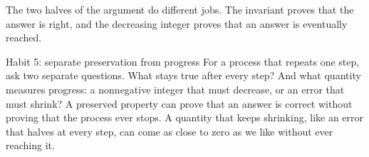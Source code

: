 The two halves of the argument do different jobs. The invariant proves that the answer is right, and the decreasing integer proves that an answer is eventually reached.

\begin{principle}{Habit 5: separate preservation from progress}
For a process that repeats one step, ask two separate questions. What stays true after every step? And what quantity measures progress: a nonnegative integer that must decrease, or an error that must shrink? A preserved property can prove that an answer is correct without proving that the process ever stops. A quantity that keeps shrinking, like an error that halves at every step, can come as close to zero as we like without ever reaching it.
\end{principle}

